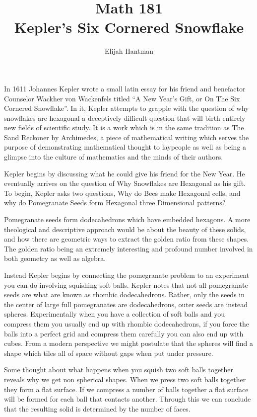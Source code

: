\documentclass{report}
\title{\Huge{Math 181}\\Kepler's Six Cornered Snowflake}
\author{\huge{Elijah Hantman}}
\date{}
\begin{document}
\maketitle
\newpage

In 1611 Johannes Kepler wrote a small latin essay for his friend and benefactor Counselor Wackher von Wackenfels titled 
“A New Year’s Gift, or On The Six Cornered Snowflake”\cite[p.xi]{kepflake}. In it, Kepler attempts to grapple with the 
question of why snowflakes are hexagonal a deceptively difficult question that will birth entirely new fields of 
scientific study. It is a work which is in the same tradition as The Sand Reckoner by Archimedes, 
a piece of mathematical writing which serves the purpose of demonstrating mathematical thought to laypeople as well as
being a glimpse into the culture of mathematics and the minds of their authors.

Kepler begins by discussing what he could give his friend for the New Year. He eventually arrives on the question of Why Snowflakes are Hexagonal \cite[p.7]{kepflake}
as his gift. To begin, Kepler asks two questions, Why do Bees make Hexagonal cells, and why do Pomegranate Seeds form Hexagonal three Dimensional patterns?

Pomegranate seeds form dodecahedrons which have embedded hexagons. A more theological and descriptive approach would be about the
beauty of these solids, and how there are geometric ways to extract the golden ratio from these shapes. The golden ratio being an
extremely interesting and profound number involved in both geometry as well as algebra.

Instead Kepler begins by connecting the pomegranate problem to an experiment you can do involving squishing soft balls. Kepler notes
that not all pomegranate seeds are what are known as rhombic dodecahedrons. Rather, only the seeds in the center of large full 
pomegranates are dodecahedrons, outer seeds are instead spheres. Experimentally when you have a collection of soft balls and you
compress them you usually end up with rhombic dodecahedrons, if you force the balls into a perfect grid and compress them carefully
you can also end up with cubes. From a modern perspective we might postulate that the spheres will find a shape which tiles all
of space without gaps when put under pressure. 

Some thought about what happens when you squish two soft balls together reveals why we get non spherical shapes. When we press two
soft balls together they form a flat surface. If we compress a number of balls together a flat surface will be formed for each ball
that contacts another. Through this we can conclude that the resulting solid is determined by the number of faces.
\end{document}
